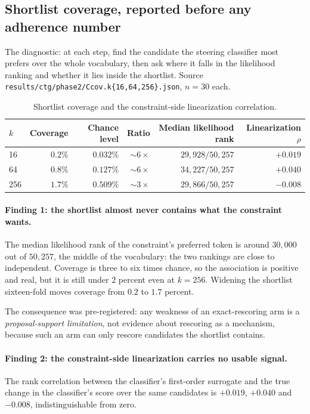 \documentclass[11pt,a4paper]{article}
\newcommand{\file}[1]{\texttt{\small #1}}
\begin{document}
\subsection{Shortlist coverage, reported before any adherence number}

The diagnostic: at each step, find the candidate the steering classifier most prefers
over the whole vocabulary, then ask where it falls in the likelihood ranking and whether
it lies inside the shortlist. Source
\file{results/ctg/phase2/Ccov.k\{16,64,256\}.json}, $n=30$ each.

\begin{table}[htbp]
\centering
\begin{tabular}{lrrrrr}
\toprule
$k$ & Coverage & Chance level & Ratio & Median likelihood rank & Linearization $\rho$ \\
\midrule
16  & $\bm{0.2\%}$ & $0.032\%$ & ${\sim}6\times$ & $29{,}928 / 50{,}257$ & $+0.019$ \\
64  & $\bm{0.8\%}$ & $0.127\%$ & ${\sim}6\times$ & $34{,}227 / 50{,}257$ & $+0.040$ \\
256 & $\bm{1.7\%}$ & $0.509\%$ & ${\sim}3\times$ & $29{,}866 / 50{,}257$ & $-0.008$ \\
\bottomrule
\end{tabular}
\caption{Shortlist coverage and the constraint-side linearization correlation.}
\end{table}

\paragraph{Finding 1: the shortlist almost never contains what the constraint wants.}
The median likelihood rank of the constraint's preferred token is around $30{,}000$ out
of $50{,}257$, the middle of the vocabulary: the two rankings are close to independent.
Coverage is three to six times chance, so the association is positive and real, but it
is still under $2$ percent even at $k=256$. Widening the shortlist sixteen-fold moves
coverage from $0.2$ to $1.7$ percent.

The consequence was pre-registered: any weakness of an exact-rescoring arm is a
\emph{proposal-support limitation}, not evidence about rescoring as a mechanism, because
such an arm can only rescore candidates the shortlist contains.

\paragraph{Finding 2: the constraint-side linearization carries no usable signal.}
The rank correlation between the classifier's first-order surrogate and the true change
in the classifier's score over the same candidates is $+0.019$, $+0.040$ and $-0.008$,
indistinguishable from zero.
\end{document}
